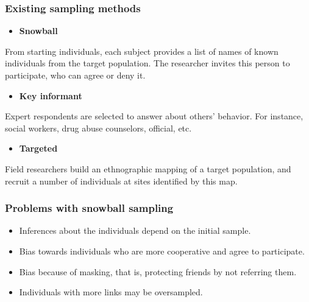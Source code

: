 \documentclass{beamer}
\newcommand{\Space}{\vspace{3ex}}
\begin{document}
\begin{frame}
    
    \frametitle{Existing sampling methods}

    \begin{itemize}
        \item {\bf Snowball} \cite{goodman1961}
    \end{itemize}

    From starting individuals, each subject provides a list of names of known
    individuals from the target population. The researcher invites this person
    to participate, who can agree or deny it. 

    \Space

    \begin{itemize}
      \item {\bf Key informant} \cite{deaux-callaghan1985}
    \end{itemize}

    Expert respondents are selected to answer about others' behavior. For
    instance, social workers, drug abuse counselors, official, etc. 

    \Space

    \begin{itemize}
      \item {\bf Targeted} \cite{watters-biernacki1989}
    \end{itemize}

   Field researchers build an ethnographic mapping of a target population, and
   recruit a number of individuals at sites identified by this map.

\end{frame}

\begin{frame}

  \frametitle{Problems with snowball sampling}

  \begin{itemize}
    \justifying
    \item Inferences about the individuals depend on the initial sample. 
    \item Bias towards individuals who are more cooperative and agree to
    participate. 
    \item Bias because of masking, that is, protecting friends by not
    referring them. 
    \item Individuals with more links may be oversampled.  
  \end{itemize}
  
\end{frame}
\end{document}
